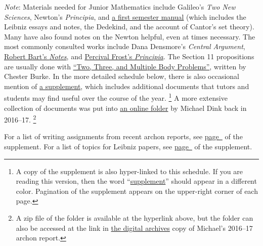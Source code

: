 \documentclass[10pt]{article}
\begin{document}
{\small \emph{Note}: Materials needed for Junior Mathematics 
include Galileo's \emph{Two New Sciences}, Newton's \emph{Principia}, and
\href{https://drive.google.com/file/d/13h-us1vPTZjGNSpHRpInOJR5JjXLNdWb/view?usp=sharing}%
{a first semester manual} (which includes the Leibniz essays and notes,
the Dedekind, and the account of Cantor's set theory).  
Many have also found notes on the Newton helpful, even at times necessary.  
The most commonly consulted works include Dana Densmore's \emph{Central Argument},
\href{https://drive.google.com/file/d/0BwccG5Ei3816aUtwck5GTUVRWkk/view?usp=sharing}{Robert
Bart's \emph{Notes}}, and
\href{https://drive.google.com/file/d/0BwccG5Ei3816cHlRaktYaTJRM0E/view?usp=sharing}%
{Percival Frost's \emph{Principia}}. 
The Section 11 propositions are usually done with
\href{https://drive.google.com/file/d/1c0gRZDPmndb5C2JiWYSOIiMQD-mNR2cD/view?usp=sharing}%
{``Two, Three, and Multiple Body Problems''}, written by Chester Burke.
In the more detailed schedule below, there is also occasional mention of
\href{https://drive.google.com/file/d/1PP99RsI_xEZ8rkgXSOlNBS2Wuk_CJkvN/view?usp=sharing}%
{a supplement}, which includes additional documents
that tutors and students may find useful over the course of the year.%
\footnote{A copy of the supplement is also hyper-linked to this schedule. 
If you are reading this version, then the word ``\hyperref[supple.1]{supplement}''
should appear in a different color. Pagination of the supplement appears on the upper-right
corner of each page.}
A more extensive collection of documents was put into
\href{https://drive.google.com/file/d/1iZOownvFcTZxxFA6KRutjVLpIjE74503/view?usp=sharing}%
{an online folder} by Michael Dink back in 2016--17.%
\footnote{A zip file of the folder is available at the hyperlink above,
but the folder can also be accessed at the link 
in \href{http://digitalarchives.sjc.edu/faculty}{the digital archives} copy
of Michael's 2016--17 archon report.}}

For a list of writing assignments from recent archon reports, see \hyperref[supple.106]{page~\pageref{supple.106}} of the supplement. 
For a list of topics for Leibniz papers, see
	\hyperref[supple.58]{page~\pageref{supple.58}} of
	the 
	supplement.


\end{document}
